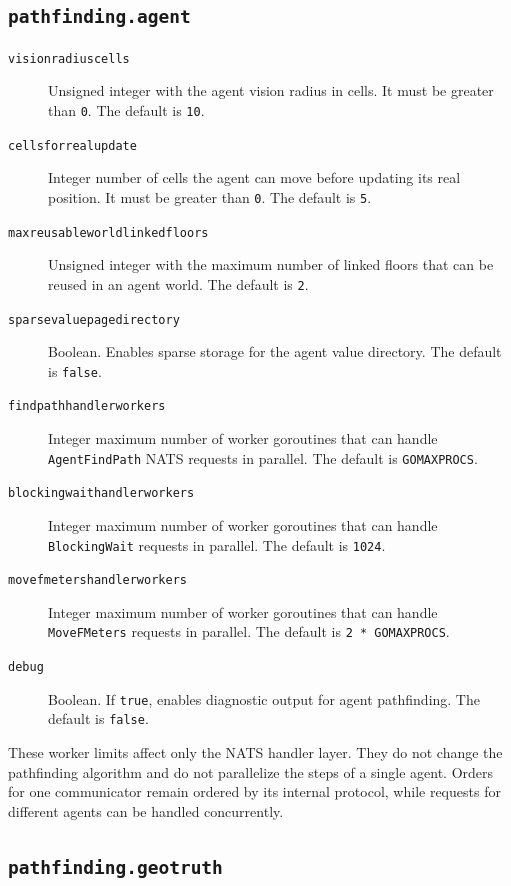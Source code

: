 \documentclass[12pt,a4paper]{report}
\begin{document}
\subsection{\texttt{pathfinding.agent}}

\begin{description}
\item[\texttt{visionradiuscells}] Unsigned integer with the agent vision radius
in cells. It must be greater than \texttt{0}. The default is \texttt{10}.
\item[\texttt{cellsforrealupdate}] Integer number of cells the agent can move
before updating its real position. It must be greater than \texttt{0}. The
default is \texttt{5}.
\item[\texttt{maxreusableworldlinkedfloors}] Unsigned integer with the maximum
number of linked floors that can be reused in an agent world. The default is
\texttt{2}.
\item[\texttt{sparsevaluepagedirectory}] Boolean. Enables sparse storage for the
agent value directory. The default is \texttt{false}.
\item[\texttt{findpathhandlerworkers}] Integer maximum number of worker
goroutines that can handle \texttt{AgentFindPath} NATS requests in parallel. The
default is \texttt{GOMAXPROCS}.
\item[\texttt{blockingwaithandlerworkers}] Integer maximum number of worker
goroutines that can handle \texttt{BlockingWait} requests in parallel. The
default is \texttt{1024}.
\item[\texttt{movefmetershandlerworkers}] Integer maximum number of worker
goroutines that can handle \texttt{MoveFMeters} requests in parallel. The
default is \texttt{2 * GOMAXPROCS}.
\item[\texttt{debug}] Boolean. If \texttt{true}, enables diagnostic output for
agent pathfinding. The default is \texttt{false}.
\end{description}

These worker limits affect only the NATS handler layer. They do not change the
pathfinding algorithm and do not parallelize the steps of a single agent. Orders
for one communicator remain ordered by its internal protocol, while requests
for different agents can be handled concurrently.

\subsection{\texttt{pathfinding.geotruth}}
\end{document}

